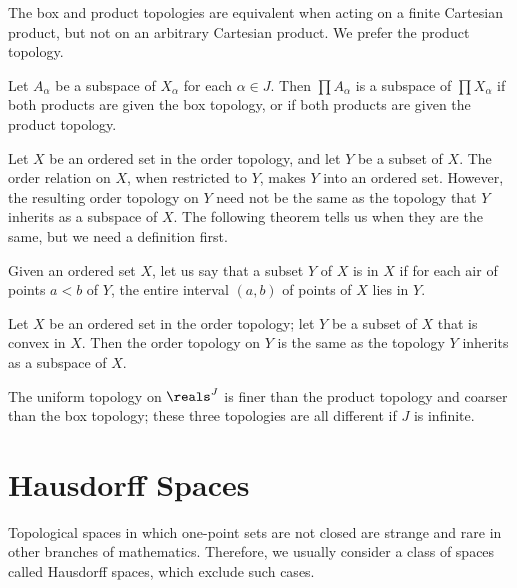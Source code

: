 The box and product topologies are equivalent when acting on a 
finite Cartesian product, but not on an arbitrary Cartesian 
product. We prefer the product topology.

\begin{theorem}
	Let $A_\alpha$ be a subspace of $X_\alpha$ for each $\alpha \in 
	J$. Then $\prod A_\alpha$ is a subspace of $\prod X_\alpha$ if 
	both products are given the box topology, or if both products 
	are given the product topology.
\end{theorem}

Let $X$ be an ordered set in the order topology, and let $Y$ be a 
subset of $X$. The order relation on $X$, when restricted to $Y$, 
makes $Y$ into an ordered set. However, the resulting order 
topology on $Y$ need not be the same as the topology that $Y$ 
inherits as a subspace of $X$. The following theorem tells us 
when they are the same, but we need a definition first.

\begin{definition}[Convex]
	Given an ordered set $X$, let us say that a subset $Y$ of $X$ 
	is  in $X$ if for each air 
	of points 
	$a < b$ of $Y$, the entire interval $(a,b)$ of points of $X$ 
	lies in $Y$.
\end{definition}

\begin{theorem}
	Let $X$ be an ordered set in the order topology; let $Y$ be a 
	subset of $X$ that is convex in $X$. Then the order topology 
	on $Y$ is the same as the topology $Y$ inherits as a subspace 
	of $X$.
\end{theorem}

\begin{theorem}
	The uniform topology on $\reals^J$ is finer than the product 
	topology and coarser than the box topology; these three 
	topologies are all different if $J$ is infinite.
\end{theorem}


\newpage

\section{Hausdorff Spaces}

Topological spaces in which one-point sets are not closed are 
strange and rare in other branches of mathematics. Therefore, we 
usually consider a class of spaces called Hausdorff spaces, which 
exclude such cases.

